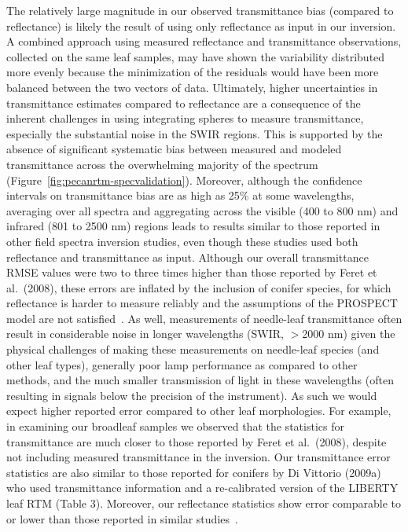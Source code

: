 The relatively large magnitude in our observed transmittance bias (compared to reflectance) is likely the result of using only reflectance as input in our inversion.
A combined approach using measured reflectance and transmittance observations, collected on the same leaf samples, may have shown the variability distributed more evenly because the minimization of the residuals would have been more balanced between the two vectors of data.
Ultimately, higher uncertainties in transmittance estimates compared to reflectance are a consequence of the inherent challenges in using integrating spheres to measure transmittance, especially the substantial noise in the SWIR regions.
This is supported by the absence of significant systematic bias between measured and modeled transmittance across the overwhelming majority of the spectrum (Figure~\ref{fig:pecanrtm-specvalidation}).
Moreover, although the confidence intervals on transmittance bias are as high as 25\% at some wavelengths, averaging over all spectra and aggregating across the visible (400 to 800 nm) and infrared (801 to 2500 nm) regions leads to results similar to those reported in other field spectra inversion studies, even though these studies used both reflectance and transmittance as input.
Although our overall transmittance RMSE values were two to three times higher than those reported by Feret et al.~(2008), \nocite{feret_2008_prospect}
these errors are inflated by the inclusion of conifer species, for which reflectance is harder to measure reliably and the assumptions of the PROSPECT model are not satisfied~\cite{jacquemoud_1990_prospect,divittorio_2009_enhancing,allen_1969_interaction}.
As well, measurements of needle-leaf transmittance often result in considerable noise in longer wavelengths (SWIR, $>$2000 nm) given
the physical challenges of making these measurements on needle-leaf species (and other leaf types),
generally poor lamp performance as compared to other methods,
and the much smaller transmission of light in these wavelengths (often resulting in signals below the precision of the instrument).
As such we would expect higher reported error compared to other leaf morphologies.
For example, in examining our broadleaf samples we observed that the statistics for transmittance are much closer to those reported by Feret et al.~(2008), despite not including measured transmittance in the inversion.
Our transmittance error statistics are also similar to those reported for conifers by Di Vittorio (2009a) who used transmittance information and a re-calibrated version of the LIBERTY leaf RTM (Table 3).
Moreover, our reflectance statistics show error comparable to or lower than those reported in similar studies~\cite{feret_2008_prospect,divittorio_2009_enhancing}.

